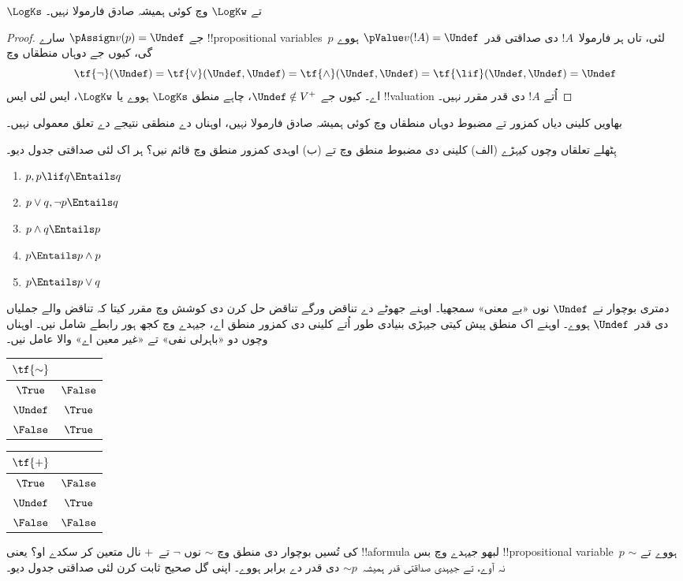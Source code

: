 \documentclass[../../../include/open-logic-section]{subfiles}
\begin{document}
\begin{prop}
  $\LogKs$ تے $\LogKw$ وچ کوئی ہمیشہ صادق فارمولا نہیں۔
\end{prop}

\begin{proof}
  جے $\pAssign v(p) = \Undef$ سارے !!{propositional variable}s~$p$
  لئی، تاں ہر فارمولا~$!A$ دی صداقتی قدر~$\pValue v(!A) =
  \Undef$ ہووے گی، کیوں جے دوہاں منطقاں وچ
  \[
    \tf{\lnot}(\Undef) = \tf{\lor}(\Undef, \Undef) = \tf{\land}(\Undef,
  \Undef) = \tf{\lif}(\Undef, \Undef) = \Undef
  \]
  اے۔ کیوں جے $\Undef \notin V^+$، چاہے منطق $\LogKs$ ہووے یا
  $\LogKw$، ایس لئی ایس !!{valuation} اُتے $!A$ دی قدر مقرر نہیں۔
\end{proof}

بھاویں کلینی دیاں کمزور تے مضبوط دوہاں منطقاں وچ کوئی
ہمیشہ صادق فارمولا نہیں، اوہناں دے منطقی نتیجے دے تعلق
معمولی نہیں۔

\begin{prob}
  ہِٹھلے تعلقاں وچوں کیہڑے (الف) کلینی دی مضبوط منطق وچ تے
  (ب) اوہدی کمزور منطق وچ قائم نیں؟ ہر اک لئی صداقتی جدول دیو۔
  \begin{enumerate}
    \item $p, p \lif q \Entails q$
    \item $p \lor q, \lnot p \Entails q$
    \item $p \land q \Entails p$
    \item $p \Entails p \land p$
    \item $p \Entails p \lor q$
  \end{enumerate}
\end{prob}

دمتری بوچوار نے $\Undef$ نوں «بے معنی» سمجھیا۔ اوہنے جھوٹے
دے تناقض ورگے تناقض حل کرن دی کوشش وچ مقرر کیتا کہ تناقض
والے جملیاں دی قدر~$\Undef$ ہووے۔ اوہنے اک منطق پیش کیتی جیہڑی
بنیادی طور اُتے کلینی دی کمزور منطق اے، جیہدے وچ کجھ ہور
رابطے شامل نیں۔ اوہناں وچوں دو «باہرلی نفی» تے «غیر معین اے»
والا عامل نیں۔
\begin{center}
  \begin{tabular}{c|c} 
    $\tf{\sim}$ & \\ 
    \hline  
    $\True$ & $\False$ \\ 
    $\Undef$ & $\True$ \\
    $\False$ & $\True$ 
  \end{tabular}
\quad
  \begin{tabular}{c|c} 
    $\tf{+}$ & \\ 
    \hline  
    $\True$ & $\False$ \\ 
    $\Undef$ & $\True$ \\
    $\False$ & $\False$ 
  \end{tabular}
\end{center}

\begin{prob}
  کی تُسیں بوچوار دی منطق وچ $\sim$ نوں $\lnot$ تے~$+$ نال
  متعین کر سکدے او؟ یعنی !!a{formula} لبھو جیہدے وچ بس
  !!{propositional
  variable}~$p$ ہووے تے $\sim$ نہ آوے، تے جیہدی صداقتی قدر
  ہمیشہ~$\mathord{\sim}p$ دی قدر دے برابر ہووے۔ اپنی گل صحیح
  ثابت کرن لئی صداقتی جدول دیو۔
\end{prob}
\end{document}
